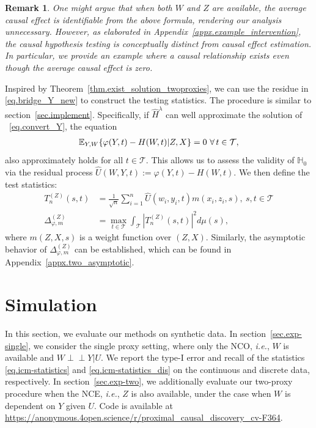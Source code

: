 \documentclass[
  12pt]{article}
\newtheorem{remark}{Remark}
\def\wh{\widehat}
\newcommand{\ind}{\perp\!\!\!\!\perp}
\def\mH{\mathbb{H}}
\def\cT{\mathcal{T}}
\begin{document}
\begin{remark}
One might argue that when both $W$ and $Z$ are available, the average causal effect is identifiable from the above formula, rendering our analysis unnecessary. However, as elaborated in Appendix~\ref{appx.example_intervention}, the causal hypothesis testing is conceptually distinct from causal effect estimation. In particular, we provide an example where a causal relationship exists even though the average causal effect is zero.
\end{remark}

Inspired by Theorem~\ref{thm.exist_solution_twoproxies}, we can use the residue in \eqref{eq.bridge_Y_new} to construct the testing statistics. The procedure is similar to section~\ref{sec.implement}. Specifically, if $\wh{H}^\lambda$ can well approximate the solution of ~\eqref{eq.convert_Y}, the equation 
\begin{align}
\label{eq.convert_YZ}
   \mathbb{E}_{Y,W}\{ \varphi(Y,t) -H(W,t) |Z,X\} =0 \ \forall \thinspace t \in \cT,
\end{align}
also approximately holds for all $t \in \cT$. This allows us to assess the validity of $\mH_0$ via the residual process $\wh{U}(W,Y,t):=\varphi(Y,t) - H(W,t)$. We then define the test statistics:
\begin{align}
    T^{(Z)}_{n}(s,t) &=\frac{1}{\sqrt{n}}\sum_{i=1}^n{\widehat{U}(w_i,y_i,t)m(x_i,z_i,s)}, \ s,t \in \cT \nonumber \\
    \Delta^{(Z)}_{\varphi, m}&=\max_{t\in\mathcal{T}}\int_{\mathcal{T}}{|T^{(Z)}_{n}(s,t)|^2d\mu(s)}, \label{eq.icm_statistics_two}
\end{align}
where $m(Z,X,s)$ is a weight function over $(Z,X)$. Similarly, the asymptotic behavior of $\Delta^{(Z)}_{\varphi, m}$ can be established, which can be found in Appendix~\ref{appx.two_asymptotic}.


\section{Simulation}
\label{sec.exp}

In this section, we evaluate our methods on synthetic data. In section~\ref{sec.exp-single}, we consider the single proxy setting, where only the NCO, \emph{i.e.}, $W$ is available and $W \ind Y|U$. We report the type-I error and recall of the statistics \eqref{eq.icm-statistics} and \eqref{eq.icm-statistics_dis} on the continuous and discrete data, respectively. In section~\ref{sec.exp-two}, we additionally evaluate our two-proxy procedure when the NCE, \emph{i.e.}, $Z$ is also available, under the case when $W$ is dependent on $Y$ given $U$. Code is available at \url{https://anonymous.4open.science/r/proximal_causal_discovery_cv-F364}.
\end{document}
